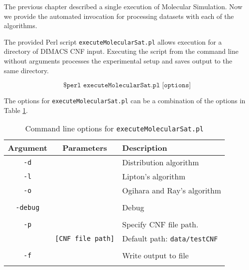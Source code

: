 The previous chapter described a single execution of Molecular Simulation.  Now we provide the automated invocation for processing datasets with each of the algorithms.

The provided Perl script \texttt{executeMolecularSat.pl} allows execution for a directory of DIMACS CNF input.  Executing the script from the command line without arguments processes the experimental setup and saves output to the same directory.

\[
\texttt{ \$ perl executeMolecularSat.pl [options]}
\]

The options for \texttt{executeMolecularSat.pl} can be a combination of the options in Table \ref{executeMolecularSatTable}.




\begin{table}[htdp]
\caption{Command line options for \texttt{executeMolecularSat.pl}}
\begin{center}
\begin{tabular}{|c|c|l|}
\hline
\textbf{Argument} & \textbf{Parameters} & \textbf{Description} \\ \hline
 \texttt{-d}	& 				   & Distribution algorithm		 \\
 \texttt{-l}	& 				   & Lipton's algorithm		 \\
 \texttt{-o}	& 				   & Ogihara and Ray's algorithm		 \\
 				&				   &		 \\ \hline 				
\texttt{-debug}		&				   & Debug		 \\ 				
 				&				   &		 \\ \hline
\texttt{-p}		&				   & Specify CNF file path. 	 \\
 				& \texttt{[CNF file path]}  &		Default path: \texttt{data/testCNF}	 \\ 			
 				&				   &		\\ \hline 	
\texttt{-f}		&				   & Write output to file		 \\
 				&				   &		\\ \hline 				
\end{tabular}
\end{center}
\label{executeMolecularSatTable}
\end{table}%

